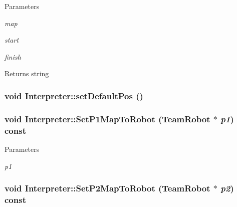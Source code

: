 \begin{DoxyParams}{Parameters}
\item[{\em map}]\item[{\em start}]\item[{\em finish}]\end{DoxyParams}
\begin{DoxyReturn}{Returns}
string 
\end{DoxyReturn}
\hypertarget{classInterpreter_aa64d5e94c2cdee7696135a360f51926b}{
\subsubsection[{setDefaultPos}]{\setlength{\rightskip}{0pt plus 5cm}void Interpreter::setDefaultPos ()}}
\label{classInterpreter_aa64d5e94c2cdee7696135a360f51926b}
\hypertarget{classInterpreter_a4e5fcbc3020f3acd2d6855d12f8fe177}{
\subsubsection[{SetP1MapToRobot}]{\setlength{\rightskip}{0pt plus 5cm}void Interpreter::SetP1MapToRobot ({\bf TeamRobot} $\ast$ {\em p1}) const}}
\label{classInterpreter_a4e5fcbc3020f3acd2d6855d12f8fe177}

\begin{DoxyParams}{Parameters}
\item[{\em p1}]\end{DoxyParams}
\hypertarget{classInterpreter_a3b96d97873572447193d3defe1bb877e}{
\subsubsection[{SetP2MapToRobot}]{\setlength{\rightskip}{0pt plus 5cm}void Interpreter::SetP2MapToRobot ({\bf TeamRobot} $\ast$ {\em p2}) const}}
\label{classInterpreter_a3b96d97873572447193d3defe1bb877e}

